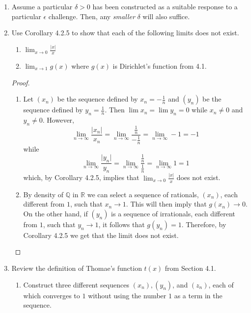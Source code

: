 \begin{enumerate}
    \item Assume a particular \( \delta > 0 \) has been constructed as a suitable response to a particular \( \epsilon \) challenge. Then, any \textit{smaller} \( \delta \) will also suffice.
    
    \item Use Corollary 4.2.5 to show that each of the following limits does not exist.
    \begin{enumerate}
        \item \( \lim_{x\rightarrow 0} \frac{\vert x \vert}{x} \) 
        
        \item \( \lim_{x \rightarrow 1} g(x) \) where \( g(x) \) is Dirichlet's function from 4.1.
    \end{enumerate}
    
    \begin{proof}
    \begin{enumerate}
        \item Let \( (x_{n}) \) be the sequence defined by \( x_{n} = - \frac{1}{n} \) and \( (y_{n}) \) be the sequence defined by \( y_{n} = \frac{1}{n} \). Then \( \lim x_{n} = \lim y_{n} = 0 \) while \( x_{n} \neq 0 \) and \( y_{n} \neq 0 \). However, 
        \[
        \lim_{n\rightarrow \infty} \frac{\vert x_{n} \vert}{x_{n}} = \lim_{n \rightarrow \infty} \frac{\frac{1}{n}}{-\frac{1}{n}} = \lim_{n \rightarrow \infty} -1 = -1
        \]
        while
        \[
        \lim_{n\rightarrow \infty} \frac{\vert y_{n} \vert}{y_{n}} = \lim_{n \rightarrow \infty} \frac{\frac{1}{n}}{\frac{1}{n}} = \lim_{n \rightarrow \infty} 1 = 1
        \]
        which, by Corollary 4.2.5, implies that \( \lim_{x \rightarrow 0 } \frac{\vert x \vert}{x} \) does not exist.
        
        \item By density of \( \mathbb{Q} \) in \( \mathbb{R} \) we can select a sequence of rationals, \( (x_{n}) \), each different from \( 1 \), such that \( x_{n} \rightarrow 1 \). This will then imply that \( g(x_{n}) \rightarrow 0 \). On the other hand, if \( (y_{n}) \) is a sequence of irrationals, each different from \( 1 \), such that \( y_{n} \rightarrow 1 \), it follows that \( g(y_{n}) = 1 \). Therefore, by Corollary 4.2.5 we get that the limit does not exist. 
    \end{enumerate}
    \end{proof}
    
    \item Review the definition of Thomae's function \( t(x) \) from Section 4.1.
    \begin{enumerate}
        \item Construct three different sequences \( (x_{n}), (y_{n}) \), and \( (z_{n}) \), each of which converges to \( 1 \) without using the number \( 1 \) as a term in the sequence. 
        

\end{enumerate}
\end{enumerate}
